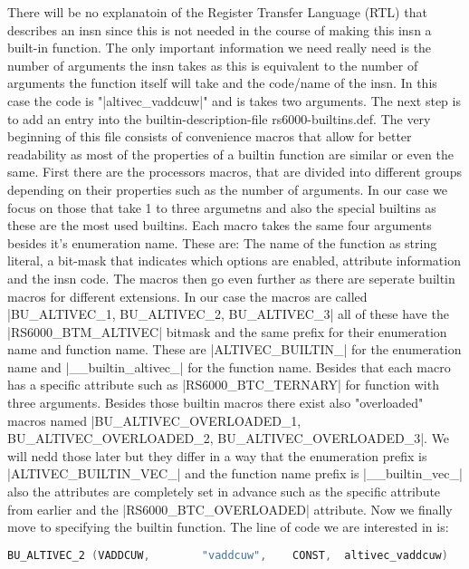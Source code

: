 There will be no explanatoin of the Register Transfer Language (RTL) that describes an insn since this is not needed in the course of making this insn a built-in function.
The only important information we need really need is the number of arguments the insn takes as this is equivalent to the number of arguments the function itself will take and the code/name of the insn. In this case the code is "|altivec_vaddcuw|" and is takes two arguments.
The next step is to add an entry into the builtin-description-file rs6000-builtins.def. The very beginning of this file consists of convenience macros that allow for better readability as most of the properties of a builtin function are similar or even the same. First there are the processors macros, that are divided into different groups depending on their properties such as the number of arguments. In our case we focus on those that take 1 to three argumetns and also the special builtins as these are the most used builtins. Each macro takes the same four arguments besides it's enumeration name. These are: The name of the function as string literal, a bit-mask that indicates which options are enabled, attribute information and the insn code.
The macros then go even further as there are seperate builtin macros for different extensions. In our case the macros are called |BU_ALTIVEC_1, BU_ALTIVEC_2, BU_ALTIVEC_3| all of these have the |RS6000_BTM_ALTIVEC| bitmask and the same prefix for their enumeration name and function name. These are |ALTIVEC_BUILTIN_| for the enumeration name and |__builtin_altivec_| for the function name. Besides that each macro has a specific attribute such as |RS6000_BTC_TERNARY| for function with three arguments.
Besides those builtin macros there exist also "overloaded" macros named |BU_ALTIVEC_OVERLOADED_1, BU_ALTIVEC_OVERLOADED_2, BU_ALTIVEC_OVERLOADED_3|. We will nedd those later but they differ in a way that the enumeration prefix is |ALTIVEC_BUILTIN_VEC_| and the function name prefix is |__builtin_vec_| also the attributes are completely set in advance such as the specific attribute from earlier and the |RS6000_BTC_OVERLOADED| attribute.
Now we finally move to specifying the builtin function. The line of code we are interested in is:

\begin{lstlisting}[language=C++,basicstyle=\ttfamily\scriptsize,keywordstyle=\color{red}]
BU_ALTIVEC_2 (VADDCUW,	      "vaddcuw",	CONST,	altivec_vaddcuw)
\end{lstlisting}

